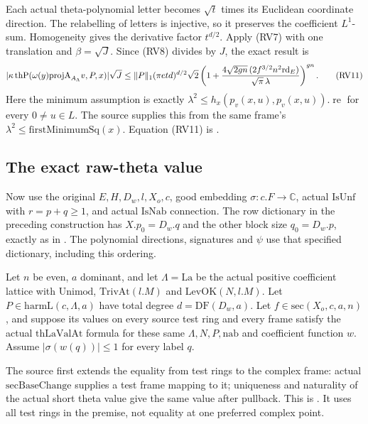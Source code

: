 Each actual theta-polynomial letter becomes
\(\sqrt t\) times its Euclidean coordinate direction.
The relabelling of letters is injective, so it preserves the
coefficient \(L^1\)-sum.
Homogeneity gives the derivative factor \(t^{d/2}\).
Apply (RV7) with one translation and \(\beta=\sqrt J\).
Since (RV8) divides by \(J\), the exact result is
\[
 |\kappa\,\mathrm{thP}(\omega(y)\mathrm{projA}_{A_\Lambda}v,P,x)|
           \sqrt J
 \le \|P\|_1(\pi e t d)^{d/2}\sqrt2
 \left(1+
 {4\sqrt{2gn}\,(2f^{3/2}n^2\mathrm{rd}_E)
                       \over\sqrt\pi\,\lambda}\right)^{gn}.
 \tag{RV11}\label{eq:sr-source-projected-vacuum-jet}
\]
Here the minimum assumption is exactly
\(\lambda^2\le h_x(p_v(x,u),p_v(x,u)).\operatorname{re}\)
for every \(0\ne u\in L\).
The source  supplies this from the same frame's
\(\lambda^2\le\mathrm{firstMinimumSq}(x)\).
Equation (RV11) is
.

\subsection{The exact raw-theta value}
Now use the original \(E,H,D_w,l,X_o,c\), good embedding
\(\sigma:c.F\to\mathbb C\), actual \(\mathrm{IsUnf}\) with
\(r=p+q\ge1\), and actual \(\mathrm{IsNab}\) connection.
The row dictionary in the preceding construction has
\(X.p_0=D_w.q\) and the other block size \(q_0=D_w.p\), exactly
as in .
The polynomial directions, signatures and \(\psi\) use that
specified dictionary, including this ordering.

Let \(n\) be even, \(a\) dominant, and let
\(\Lambda=\mathrm{La}\) be the actual positive coefficient
lattice with \(\mathrm{Unimod}\),
\(\mathrm{TrivAt}(l.M)\) and \(\mathrm{LevOK}(N,l.M)\).
Let \(P\in\mathrm{harmL}(c,\Lambda,a)\) have total degree
\(d=\mathrm{DF}(D_w,a)\).
Let \(f\in\mathrm{sec}(X_o,c,a,n)\), and suppose its values on
every source test ring and every frame satisfy the actual
\(\mathrm{thLaValAt}\) formula for these same
\(\Lambda,N,P,\mathrm{nab}\) and coefficient function \(w\).
Assume \(|\sigma(w(q))|\le1\) for every label \(q\).

The source first extends the equality from test rings to the
complex frame: actual \(\mathrm{secBaseChange}\) supplies a
test frame mapping to it; uniqueness and naturality of the
actual short theta value give the same value after pullback.
This is .
It uses all test rings in the premise, not equality at one
preferred complex point.

